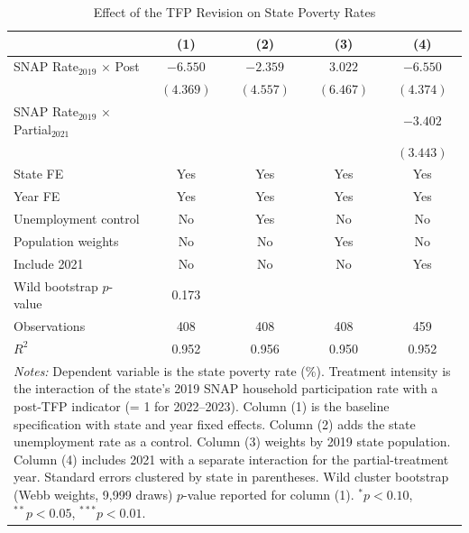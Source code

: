 \begin{table}[htbp]
\centering
\caption{Effect of the TFP Revision on State Poverty Rates}
\label{tab:poverty}
\begin{tabular}{lcccc}
\hline\hline
 & (1) & (2) & (3) & (4) \\
\hline
SNAP Rate$_{2019}$ $\times$ Post & $-6.550$ & $-2.359$ & $3.022$ & $-6.550$ \\
 & $(4.369)$ & $(4.557)$ & $(6.467)$ & $(4.374)$ \\
SNAP Rate$_{2019}$ $\times$ Partial$_{2021}$ & & & & $-3.402$ \\
 & & & & $(3.443)$ \\
\hline
State FE & Yes & Yes & Yes & Yes \\
Year FE & Yes & Yes & Yes & Yes \\
Unemployment control & No & Yes & No & No \\
Population weights & No & No & Yes & No \\
Include 2021 & No & No & No & Yes \\
Wild bootstrap $p$-value & 0.173 & & & \\
\hline
Observations & 408 & 408 & 408 & 459 \\
$R^2$ & 0.952 & 0.956 & 0.950 & 0.952 \\
\hline\hline
\multicolumn{5}{p{0.95\textwidth}}{\footnotesize \textit{Notes:} Dependent variable is the state poverty rate (\%). Treatment intensity is the interaction of the state's 2019 SNAP household participation rate with a post-TFP indicator (= 1 for 2022--2023). Column (1) is the baseline specification with state and year fixed effects. Column (2) adds the state unemployment rate as a control. Column (3) weights by 2019 state population. Column (4) includes 2021 with a separate interaction for the partial-treatment year. Standard errors clustered by state in parentheses. Wild cluster bootstrap (Webb weights, 9,999 draws) $p$-value reported for column (1). $^{*}p<0.10$, $^{**}p<0.05$, $^{***}p<0.01$.} \\
\end{tabular}
\end{table}
